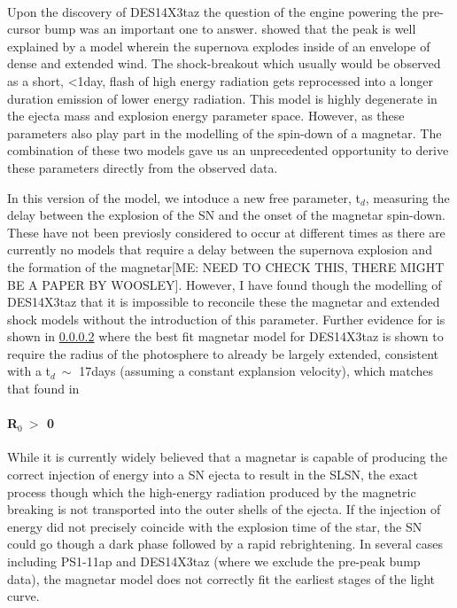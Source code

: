 \paragraph{\citet{Piro2015}}
Upon the discovery of DES14X3taz the question of the engine powering the pre-cursor bump was an important one to answer. \citet{Smith2016} showed that the peak is well explained by a model wherein the supernova explodes inside of an envelope of dense and extended wind. The shock-breakout which usually would be observed as a short, <1day, flash of high energy radiation gets reprocessed into a longer duration emission of lower energy radiation. This model is highly degenerate in the ejecta mass and explosion energy parameter space. However, as these parameters also play part in the modelling of the spin-down of a magnetar. The combination of these two models gave us an unprecedented opportunity to derive these parameters directly from the observed data.

In this version of the model, we intoduce a new free parameter, t$_d$, measuring the delay between the explosion of the SN and the onset of the magnetar spin-down. These have not been previosly considered to occur at different times \citep{Nicolls} as there are currently no models that require a delay between the supernova explosion and the formation of the magnetar[ME: NEED TO CHECK THIS, THERE MIGHT BE A PAPER BY WOOSLEY]. However, I have found though the modelling of DES14X3taz that it is impossible to reconcile these the magnetar and extended shock models without the introduction of this parameter. Further evidence for is shown in \cref{par:R0nonzero} where the best fit magnetar model for DES14X3taz is shown to require the radius of the photosphere to already be largely extended, consistent with a t$_d ~\sim$ 17days (assuming a constant explansion velocity), which matches that found in \citet{Smith2016}

\paragraph{R$_0~>$ 0}
\label{par:R0nonzero}
While it is currently widely believed that a magnetar is capable of producing the correct injection of energy into a SN ejecta to result in the SLSN, the exact process though which the high-energy radiation produced by the magnetric breaking is not transported into the outer shells of the ejecta. If the injection of energy did not precisely coincide with the explosion time of the star, the SN could go though a dark phase followed by a rapid rebrightening. In several cases including PS1-11ap and DES14X3taz (where we exclude the pre-peak bump data), the magnetar model does not correctly fit the earliest stages of the light curve.

